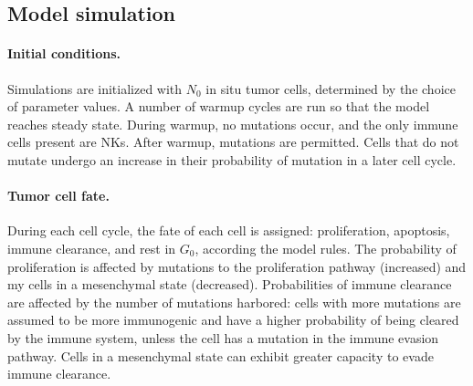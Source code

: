 \documentclass[11pt]{article}
\begin{document}
\subsection{Model simulation}
\paragraph{Initial conditions.}
Simulations are initialized with $N_0$ in situ tumor cells, determined by the choice of parameter values. A number of warmup cycles are run so that the model reaches steady state.
During warmup, no mutations occur, and the only immune cells present are NKs.
After warmup, mutations are permitted. Cells that do not mutate undergo an increase in their probability of mutation in a later cell cycle.

\paragraph{Tumor cell fate.}
During each cell cycle, the fate of each cell is assigned: proliferation, apoptosis, immune clearance, and rest in $G_0$, according the model rules. The probability of proliferation is affected by mutations to the proliferation pathway (increased) and my cells in a mesenchymal state (decreased). Probabilities of immune clearance are affected by the number of mutations harbored: cells with more mutations are assumed to be more immunogenic and have a higher probability of being cleared by the immune system, unless the cell has a mutation in the immune evasion pathway. Cells in a mesenchymal state can exhibit greater capacity to evade immune clearance.
\end{document}
